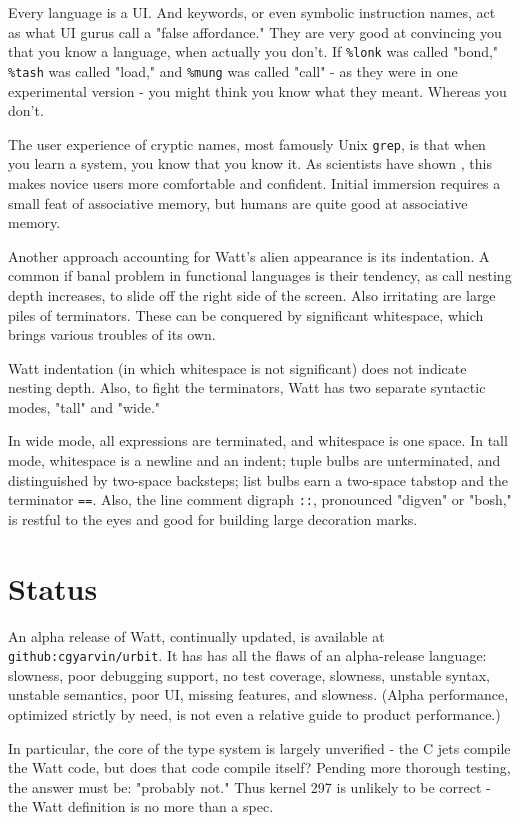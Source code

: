 \documentclass[10pt, nocopyrightspace]{sigplanconf}
\begin{document}
Every language is a UI.  And keywords, or even symbolic
instruction names, act as what UI gurus call a "false
affordance."  They are very good at convincing you that you know
a language, when actually you don't.  If \verb|%lonk| was called
"bond," \verb|%tash| was called "load," and \verb|%mung| was
called "call" - as they were in one experimental version - you
might think you know what they meant.  Whereas you don't.

The user experience of cryptic names, most famously Unix
\verb|grep|, is that when you learn a system, you know that you
know it.  As scientists have shown \citep{unixtrouble},
this makes novice users more comfortable and confident.  Initial
immersion requires a small feat of associative memory, but humans
are quite good at associative memory.

Another approach accounting for Watt's alien appearance is its
indentation.  A common if banal problem in functional languages
is their tendency, as call nesting depth increases, to slide off
the right side of the screen.  Also irritating are large piles of
terminators.  These can be conquered by significant whitespace,
which brings various troubles of its own.

Watt indentation (in which whitespace is not significant) does
not indicate nesting depth.  Also, to fight the terminators, Watt
has two separate syntactic modes, "tall" and "wide."  

In wide
mode, all expressions are terminated, and whitespace is one
space.  In tall mode, whitespace is a newline and an indent;
tuple bulbs are unterminated, and distinguished by two-space
backsteps; list bulbs earn a two-space tabstop and the terminator
\verb|==|.  Also, the line comment digraph \verb|::|, pronounced
"digven" or "bosh," is restful to the eyes and good for building
large decoration marks.

\section{Status}

An alpha release of Watt, continually updated, is available at 
\verb|github:cgyarvin/urbit|.  It has 
has all the flaws of an alpha-release language: slowness, poor
debugging support, no test coverage, slowness, unstable syntax,
unstable semantics, poor UI, missing features, and slowness.
(Alpha performance, optimized strictly by need, is not even a 
relative guide to product performance.)

In particular, the core of the type system is largely unverified -
the C jets compile the Watt code, but does that code compile itself? 
Pending more thorough testing, the answer must be: "probably not."
Thus kernel 297 is unlikely to be correct - the Watt definition is
no more than a spec.
\end{document}
